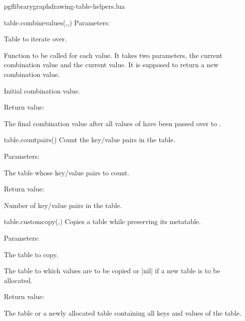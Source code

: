 \begin{filedescription}{pgflibrarygraphdrawing-table-helpers.lua}
\begin{luacommand}{{table.combine\textunderscore{}values}(,,)}
Parameters:
\begin{parameterdescription}
	\item[\meta{input}] Table to iterate over.\item[\meta{combine\_func}] Function to be called for each value. It takes two parameters, the current combination value and the current value. It is supposed to return a new combination value.\item[\meta{initial\_value}] Initial combination value. 
\end{parameterdescription}


Return value:
\begin{parameterdescription} 
  \item[] The final combination value after all values of  have been passed over to . 
\end{parameterdescription}


\end{luacommand}
\begin{luacommand}{{table.count\textunderscore{}pairs}()}
Count the key/value pairs in the table. 

Parameters:
\begin{parameterdescription}
	\item[\meta{input}] The table whose key/value pairs to count. 
\end{parameterdescription}


Return value:
\begin{parameterdescription} 
  \item[] Number of key/value pairs in the table. 
\end{parameterdescription}


\end{luacommand}
\begin{luacommand}{{table.custom\textunderscore{}copy}(,)}
Copies a table while preserving its metatable. 

Parameters:
\begin{parameterdescription}
	\item[\meta{source}] The table to copy.\item[\meta{target}] The table to which values are to be copied or |nil| if a new table is to be allocated. 
\end{parameterdescription}


Return value:
\begin{parameterdescription} 
  \item[] The  table or a newly allocated table containing all keys and values of the  table. 
\end{parameterdescription}



\end{luacommand}
\end{filedescription}
